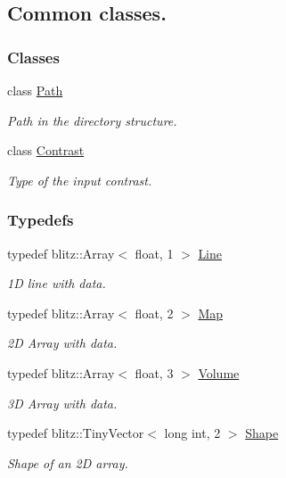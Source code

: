 \hypertarget{group__Types}{
\subsection{Common classes.}
\label{group__Types}
}
\subsubsection*{Classes}
\begin{DoxyCompactItemize}
\item 
class \hyperlink{classPath}{Path}
\begin{DoxyCompactList}\small\item\em Path in the directory structure. \item\end{DoxyCompactList}\item 
class \hyperlink{classContrast}{Contrast}
\begin{DoxyCompactList}\small\item\em Type of the input contrast. \item\end{DoxyCompactList}\end{DoxyCompactItemize}
\subsubsection*{Typedefs}
\begin{DoxyCompactItemize}
\item 
typedef blitz::Array$<$ float, 1 $>$ \hyperlink{group__Types_ga4ce3fdeba27702c8b09a141e22709e38}{Line}
\begin{DoxyCompactList}\small\item\em 1D line with data. \item\end{DoxyCompactList}\item 
typedef blitz::Array$<$ float, 2 $>$ \hyperlink{group__Types_ga8747378c016fc11d9ecbb98787248c25}{Map}
\begin{DoxyCompactList}\small\item\em 2D Array with data. \item\end{DoxyCompactList}\item 
typedef blitz::Array$<$ float, 3 $>$ \hyperlink{group__Types_ga556356a8f294cbe88e8695c7c91cfe08}{Volume}
\begin{DoxyCompactList}\small\item\em 3D Array with data. \item\end{DoxyCompactList}\item 
typedef blitz::TinyVector$<$ long int, 2 $>$ \hyperlink{group__Types_ga777964671cb4315ce8c56c920db031e3}{Shape}
\begin{DoxyCompactList}\small\item\em Shape of an 2D array. \item\end{DoxyCompactList}\end{DoxyCompactItemize}
